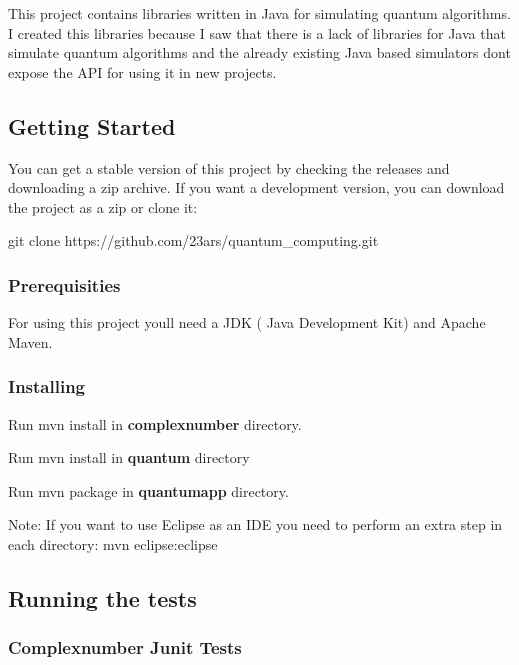 This project contains libraries written in Java for simulating quantum algorithms. I created this libraries because I saw that there is a lack of libraries for Java that simulate quantum algorithms and the already existing Java based simulators don\textquotesingle{}t expose the A\+PI for using it in new projects.

\subsection*{Getting Started}

You can get a stable version of this project by checking the releases and downloading a zip archive. If you want a development version, you can download the project as a zip or clone it\+:


\begin{DoxyCode}
git clone https://github.com/23ars/quantum\_computing.git
\end{DoxyCode}


\subsubsection*{Prerequisities}

For using this project you\textquotesingle{}ll need a J\+DK ( Java Development Kit) and Apache Maven.

\subsubsection*{Installing}


\begin{DoxyEnumerate}
\item Run {\ttfamily mvn install} in {\bfseries complexnumber} directory.
\item Run {\ttfamily mvn install} in {\bfseries quantum} directory
\item Run {\ttfamily mvn package} in {\bfseries quantumapp} directory.
\end{DoxyEnumerate}

Note\+: If you want to use Eclipse as an I\+DE you need to perform an extra step in each directory\+: {\ttfamily mvn eclipse\+:eclipse}

\subsection*{Running the tests}

\subsubsection*{Complexnumber Junit Tests}

